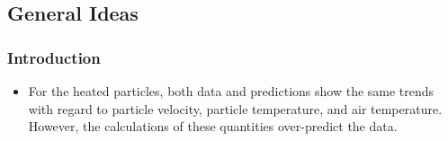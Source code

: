 \documentclass[12pt]{article}
\begin{document}
\subsection{General Ideas}

\subsubsection{Introduction}
\begin{itemize}
	\item For the heated particles, both
	data and predictions show the same trends with regard to particle velocity, particle
	temperature, and air temperature. However, the calculations of these quantities
	over-predict the data.
\end{itemize}
\end{document}
